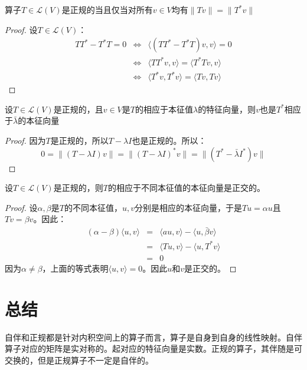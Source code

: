 \documentclass[10pt,a4paper,UTF8]{article}
\begin{document}
\begin{tikztheorem}
算子\(T\in \mathcal{L}(V)\)是正规的当且仅当对所有\(v\in V\)均有\(\lVert Tv \rVert = \lVert T^{*}v \rVert\)
\end{tikztheorem}
\begin{proof}
设\(T\in \mathcal{L}(V)\)：
\begin{eqnarray}
\label{eq:16}
TT^{*} - T^{*}T = 0&\Leftrightarrow& \langle (TT^{*} - T^{*}T )v,v \rangle =0 \\
&\Leftrightarrow& \langle TT^{*}v,v \rangle = \langle T^{*}Tv,v \rangle \\
&\Leftrightarrow& \langle T^{*}v,T^{*}v \rangle = \langle Tv,Tv \rangle
\end{eqnarray}
\end{proof}
\begin{tikztheorem}
设\(T\in \mathcal{L}(V)\)是正规的，且\(v\in V\)是\(T\)的相应于本征值\(\lambda\)的特征向量，则\(v\)也是\(T^{*}\)相应于\(\bar{\lambda}\)的本征向量
\end{tikztheorem}
\begin{proof}
因为\(T\)是正规的，所以\(T-\lambda I\)也是正规的。所以：
\begin{equation}
\label{eq:17}
0= \lVert (T-\lambda I)v \rVert = \lVert (T-\lambda I)^{*} v \rVert = \lVert (T^{*} - \bar{\lambda}I^{*})v \rVert
\end{equation}
\end{proof}
\begin{tikztheorem}
设\(T\in \mathcal{L}(V)\)是正规的，则\(T\)的相应于不同本征值的本征向量是正交的。
\end{tikztheorem}
\begin{proof}
设\(\alpha,\beta\)是\(T\)的不同本征值，\(u,v\)分别是相应的本征向量，于是\(Tu=\alpha u\)且\(Tv = \beta v\)。因此：
\begin{eqnarray}
\label{eq:18}
(\alpha - \beta) \langle u,v \rangle  &=& \langle au,v \rangle - \langle u,\bar{\beta}v \rangle  \\
&=& \langle Tu,v \rangle - \langle u,T^{*}v \rangle \\
&=& 0
\end{eqnarray}
因为\(\alpha \neq \beta\)，上面的等式表明\(\langle u,v \rangle =0\)。因此\(u\)和\(v\)是正交的。
\end{proof}
\section{总结}
\label{sec:orgd8f3384}


自伴和正规都是针对内积空间上的算子而言，算子是自身到自身的线性映射。自伴算子对应的矩阵是实对称的。起对应的特征向量是实数。正规的算子，其伴随是可交换的，但是正规算子不一定是自伴的。
\end{document}
